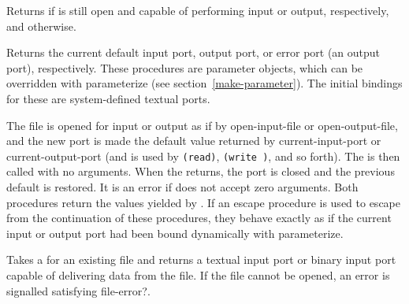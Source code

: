 \begin{entry}{%
}

Returns \schtrue{} if  is still open and capable of
performing input or output, respectively, and \schfalse{} otherwise.


\end{entry}


\begin{entry}{%
}

Returns the current default input port, output port, or error port (an
output port), respectively.  These procedures are parameter objects, which can be
overridden with {\cf parameterize} (see
section~\ref{make-parameter}). The initial bindings for these
are system-defined textual ports.

\end{entry}


\begin{entry}{%
}

The file is opened for input or output
as if by {\cf open-input-file} or {\cf open-output-file}, 
and the new port is made the default value returned by
{\cf current-input-port} or {\cf current-output-port}
(and is used by {\tt (read)}, {\tt (write )}, and so forth).
The  is then called with no arguments.  When the  returns,
the port is closed and the previous default is restored.
It is an error if  does not accept zero arguments.
Both procedures return the values yielded by .
If an escape procedure
is used to escape from the continuation of these procedures, they
behave exactly as if the current input or output port had been bound
dynamically with {\cf parameterize}.


\end{entry}


\begin{entry}{%
}
 
Takes a  for an existing file and returns a textual
input port or binary input port capable of delivering data from the
file.  If the file cannot be opened, an error is signalled satisfying {\cf file-error?}.

\end{entry}


